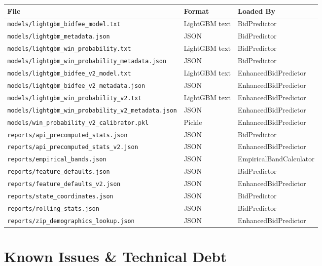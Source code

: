\documentclass[11pt,a4paper]{article}
\newcommand{\file}[1]{\texttt{\color{gssblue!70!black}#1}}
\begin{document}
\begin{longtable}{p{6.5cm} l p{4cm}}
\toprule
\textbf{File} & \textbf{Format} & \textbf{Loaded By} \\
\midrule
\endhead
\file{models/lightgbm\_bidfee\_model.txt} & LightGBM text & BidPredictor \\
\file{models/lightgbm\_metadata.json} & JSON & BidPredictor \\
\file{models/lightgbm\_win\_probability.txt} & LightGBM text & BidPredictor \\
\file{models/lightgbm\_win\_probability\_metadata.json} & JSON & BidPredictor \\
\file{models/lightgbm\_bidfee\_v2\_model.txt} & LightGBM text & EnhancedBidPredictor \\
\file{models/lightgbm\_bidfee\_v2\_metadata.json} & JSON & EnhancedBidPredictor \\
\file{models/lightgbm\_win\_probability\_v2.txt} & LightGBM text & EnhancedBidPredictor \\
\file{models/lightgbm\_win\_probability\_v2\_metadata.json} & JSON & EnhancedBidPredictor \\
\file{models/win\_probability\_v2\_calibrator.pkl} & Pickle & EnhancedBidPredictor \\
\file{reports/api\_precomputed\_stats.json} & JSON & BidPredictor \\
\file{reports/api\_precomputed\_stats\_v2.json} & JSON & EnhancedBidPredictor \\
\file{reports/empirical\_bands.json} & JSON & EmpiricalBandCalculator \\
\file{reports/feature\_defaults.json} & JSON & BidPredictor \\
\file{reports/feature\_defaults\_v2.json} & JSON & EnhancedBidPredictor \\
\file{reports/state\_coordinates.json} & JSON & BidPredictor \\
\file{reports/rolling\_stats.json} & JSON & BidPredictor \\
\file{reports/zip\_demographics\_lookup.json} & JSON & EnhancedBidPredictor \\
\bottomrule
\end{longtable}

\section{Known Issues \& Technical Debt}
\label{sec:issues}
\end{document}
